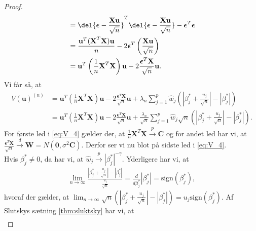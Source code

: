 \begin{proof}
\begin{align*}
&= \del{\boldsymbol{\epsilon} - \frac{\textbf{X}\textbf{u}}{\sqrt{n}}}^T \del{\boldsymbol{\epsilon} - \frac{\textbf{X}\textbf{u}}{\sqrt{n}}} - \boldsymbol{\epsilon}^T \boldsymbol{\epsilon} \\
& = \frac{\textbf{u}^T (\textbf{X}^T\textbf{X})  \textbf{u}}{n} - 2 \boldsymbol{\epsilon}^T \left( \frac{\mathbf{X}\mathbf{u}}{\sqrt{n}} \right) \\ 
&= \textbf{u}^T \left(\frac{1}{n}\textbf{X}^T\textbf{X}\right)  \textbf{u}- 2 \frac{\boldsymbol{\epsilon}^T \textbf{X}}{\sqrt{n}}\textbf{u}.
\end{align*}
Vi får så, at 
\begin{align}
V(\mathbf{u})^{(n)} & = \textbf{u}^T \left(\frac{1}{n}\textbf{X}^T\textbf{X}\right)  \textbf{u} - 2 \frac{\boldsymbol{\epsilon}^T \textbf{X}}{\sqrt{n}}\textbf{u} + \lambda_n \sum_{j=1}^p \hat{w}_j \left( \left\vert \beta_j^{*} + \frac{u_j}{\sqrt{n}} \right\vert - \left\vert \beta_j^{*}\right\vert
\right) \nonumber \\
 & = \textbf{u}^T \left(\frac{1}{n}\textbf{X}^T\textbf{X}\right)  \textbf{u} - 2 \frac{\boldsymbol{\epsilon}^T \textbf{X}}{\sqrt{n}}\textbf{u} +\frac{\lambda_n}{\sqrt{n}} \sum_{j=1}^p \hat{w}_j \sqrt{n} \left( \left\vert \beta_j^{*} + \frac{u_j}{\sqrt{n}} \right\vert - \left\vert \beta_j^{*} \right\vert
\right). \label{eq:V_4}
\end{align}
%
For første led i \eqref{eq:V_4} gælder der, at $\frac{1}{n} \mathbf{X}^T \mathbf{X} \overset{p}{\rightarrow} \mathbf{C}$ og for andet led har vi, at $\frac{\boldsymbol{\epsilon}^T \mathbf{X}}{\sqrt{n}} \overset{d}{\rightarrow} \textbf{W}=N(\textbf{0},\sigma^2 \boldsymbol{C})$. 
Derfor ser vi nu blot på sidste led i \eqref{eq:V_4}. \\
Hvis $\beta_j^{*} \neq 0$, da har vi, at $\hat{w}_j \overset{p}{\rightarrow} \left\vert \beta_j^{*} \right\vert^{-\gamma}$. Yderligere har vi, at 
\begin{align*}
\lim_{n\rightarrow \infty}
\frac{\left\vert \beta_j^{*} +\frac{u_j}{\sqrt{n}} \right\vert - \left\vert \beta_j^{*} \right\vert}{\frac{u_j}{\sqrt{n}}} =\frac{d}{d \beta_j^{*}} \left\vert \beta_j^{*} \right\vert =\text{sign}\left(\beta_j^{*} \right),
\end{align*} 
hvoraf der gælder, at $\lim_{n\rightarrow \infty} \sqrt{n} \left( \left\vert \beta_j^{*} +\frac{u_j}{\sqrt{n}} \right\vert - \left\vert \beta_j^{*} \right\vert \right) = u_j \text{sign}\left(\beta_j^{*} \right)$.
Af Slutskys sætning \ref{thm:sluktsky} har vi, at 
\begin{align*}

\end{align*}
\end{proof}
